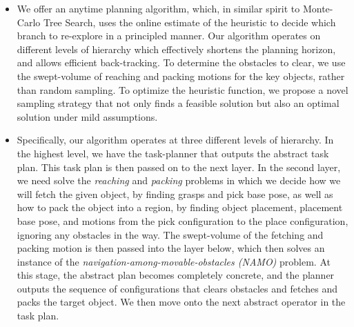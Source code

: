 \documentclass[10pt,letterpaper]{article}
\begin{document}
\begin{itemize}
\item We offer an anytime planning algorithm, which, in similar spirit to
Monte-Carlo Tree Search, uses the online estimate of the heuristic
to decide which branch to re-explore in a principled manner. Our algorithm
operates on different levels of hierarchy which effectively 
shortens the planning horizon, and allows efficient back-tracking. To determine
the obstacles to clear, we use the swept-volume of reaching and packing motions
for the key objects, rather than random sampling.
To optimize the heuristic function, we propose a novel sampling strategy that
not only finds a feasible solution but also an optimal solution under
mild assumptions.
\item Specifically, our algorithm operates at three different levels of hierarchy.
In the highest level, we have the task-planner that outputs the abstract
task plan. This task plan is then passed on to the next layer.
In the second layer, we need solve the \emph{reaching} and \emph{packing}
problems in which we decide how we will fetch the given object, by finding grasps
and pick base pose, as well as how to pack the object into a region,
by finding object placement, placement base pose,
and motions from the pick configuration to the place configuration,
ignoring any obstacles in the way. The swept-volume of the fetching and packing
motion is then passed into the layer below, which then solves an instance
of the \emph{navigation-among-movable-obstacles (NAMO)} problem. At
this stage, the abstract plan becomes completely concrete, and the
planner outputs the sequence of configurations that clears obstacles
and fetches and packs the target object. We then move onto the next abstract 
operator in the task plan.

\iffalse
\item To gain planning efficiency to find the first feasible solution
yet optimize the plan, we take the finding-and-committing 
approach: we first find a feasible solution for each step in the task-plan
 and each level of hierarchy and commit to it without back-tracking across 
them, and move onto the next. This will not affect correctness of our
algorithm, because while how we fetch, pack, and clear obstacles
for the first object in the task-plan may influence the
optimality for the next plan, but it will not affect feasibility.

At each level of hierarchy and each step in the task plan, the latter
part of the planning problem cannot be defined until we solve the
earlier part. For instance, we cannot solve the NAMO problem associated
with fetching and packing an object, because we do not have a swept-volume
yet. We also cannot move onto the 
\item What do I want to say next? Introduce MCTS. Introduce the idea
of committing and then optimizing. We have reward functions.
We have 
\item  
\fi
\end{itemize}
\end{document}
